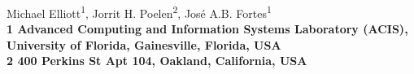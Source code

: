 \begin{flushleft}

{\Large
 \textbf{}
 }
 \newline
Michael Elliott\textsuperscript{1},
Jorrit H. Poelen\textsuperscript{2},
José A.B. Fortes\textsuperscript{1}
\bigskip
\\
\bf{1} Advanced Computing and Information Systems Laboratory (ACIS), University of Florida, Gainesville, Florida, USA
\\
\bf{2} 400 Perkins St Apt 104, Oakland, California, USA
\bigskip


\end{flushleft}

